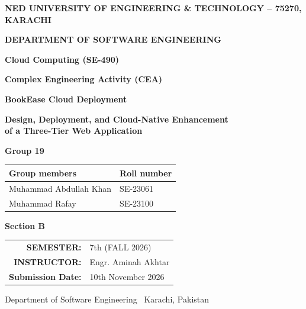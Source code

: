 \documentclass[10pt,a4paper]{article}
\begin{document}
\thispagestyle{empty}
\vspace*{16mm}
\begin{center}
{\Large\bfseries NED UNIVERSITY OF ENGINEERING \& TECHNOLOGY -- 75270,\\[2pt] KARACHI}\par
\vspace{7mm}
{\large\bfseries DEPARTMENT OF SOFTWARE ENGINEERING}\par
\vspace{21mm}
{\Large\bfseries Cloud Computing (SE-490)}\par
\vspace{4mm}
{\Large\bfseries Complex Engineering Activity (CEA)}\par
\vspace{15mm}
{\color{navy}\Huge\bfseries BookEase Cloud Deployment}\par
\vspace{7mm}
{\large\bfseries Design, Deployment, and Cloud-Native Enhancement\\[3pt] of a Three-Tier Web Application}\par
\vspace{16mm}
{\Large\bfseries Group 19}\par
\vspace{8mm}
\begin{tabular}{>{\raggedright\arraybackslash}p{70mm} >{\centering\arraybackslash}p{35mm}}
\toprule
\textbf{Group members} & \textbf{Roll number}\\
\midrule
Muhammad Abdullah Khan & SE-23061\\
Muhammad Rafay & SE-23100\\
\bottomrule
\end{tabular}
\par\vspace{9mm}
{\large\bfseries Section B}\par
\vspace{7mm}
\begin{tabular}{rl}
\textbf{SEMESTER:} & 7th (FALL 2026)\\
\textbf{INSTRUCTOR:} & Engr. Aminah Akhtar\\
\textbf{Submission Date:} & 10th November 2026\\
\end{tabular}
\end{center}
\vfill
\begin{center}\small Department of Software Engineering \textbullet\ Karachi, Pakistan\end{center}
\clearpage
\end{document}
